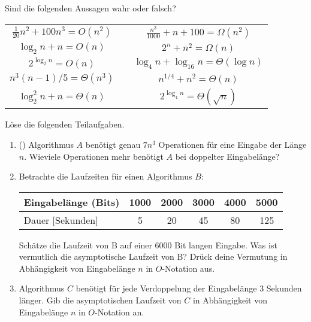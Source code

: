 \documentclass{uebung_cs}
\begin{document}
\begin{aufgabe}
	Sind die folgenden Aussagen wahr oder falsch?
	\begin{center}
		\begin{tabular}{ccc}
			$\frac{1}{20}n^2 + 100 n^3 = O(n^2)$
			&\mbox{}\hspace{2cm}\mbox{}&
			$\frac{n^3}{1000} + n + 100 = \Omega(n^2)$\\
			$\log_2 n + n = O(n)$&&
			$2^n + n^2 = \Omega(n)$\\
			$2^{\log_2 n} = O(n)$&&
			$\log_4 n + \log_{16} n = \Theta(\log n)$\\
			$n^3(n-1)/5 = \Theta(n^3)$&&
			$n^{1/4} + n^2 = \Theta(n)$\\
			$\log_2^2n + n = \Theta(n)$&&
			$2^{\log_4n} = \Theta(\sqrt{n})$
		\end{tabular}
	\end{center}
\end{aufgabe}

\begin{aufgabe}[Verdopplungen]
	Löse die folgenden Teilaufgaben.
	\begin{enumerate}
		\item (\warmup) Algorithmus $A$ benötigt genau $7n^3$ Operationen für eine Eingabe der Länge $n$.
		Wieviele Operationen mehr benötigt $A$ bei doppelter Eingabelänge?
		\item Betrachte die Laufzeiten für einen Algorithmus $B$:
		\begin{table}[h!]
		\centering
		\begin{tabular}{|l|c|c|c|c|c|}
			\hline
			Eingabelänge (Bits) & 1000 & 2000 & 3000 & 4000 & 5000\\
			\hline
			Dauer [Sekunden] & 5 & 20 & 45 & 80 & 125 \\
			\hline
		\end{tabular}
		\end{table}
		
		Schätze die Laufzeit von B auf einer 6000 Bit langen Eingabe.
		Was ist vermutlich die asymptotische Laufzeit von B? Drück deine Vermutung in Abhängigkeit von Eingabelänge $n$ in $O$-Notation aus.
		\item Algorithmus $C$ benötigt für jede Verdoppelung der Eingabelänge 3 Sekunden länger. 
		Gib die asymptotischen Laufzeit von $C$ in Abhängigkeit von Eingabelänge $n$ in $O$-Notation an.
	\end{enumerate}
\end{aufgabe}
\end{document}
